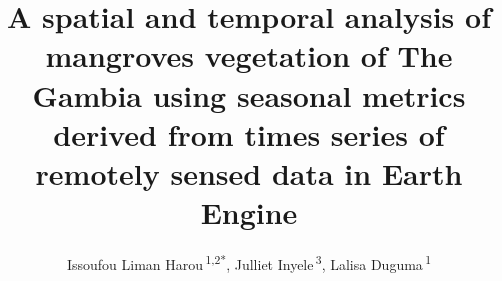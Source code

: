 \documentclass[utf8]{frontiersSCNS}
\def\Authors{
  Issoufou Liman Harou\,\textsuperscript{1,2*},
  Julliet Inyele\,\textsuperscript{3},
  Lalisa Duguma\,\textsuperscript{1}}
\def\firstAuthorLast{Liman Harou {et~al.}}
\begin{document}
\onecolumn
{}


\title[A spatial and temporal analysis of mangroves vegetation of The
Gambia]{A spatial and temporal analysis of mangroves vegetation of The
Gambia using seasonal metrics derived from times series of remotely
sensed data in Earth Engine}
\author[\firstAuthorLast]{\Authors}
\address{} %
\correspondance{} %

\extraAuth{}%


\maketitle
\end{document}
